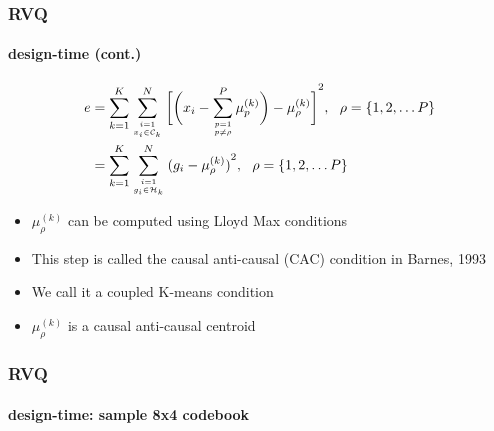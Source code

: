 \begin{frame}
\frametitle{RVQ}
\framesubtitle{design-time (cont.)}
\mypagenum
\scriptsize
\begin{align*}
e	&= \KmeansSum{\bigg[\RVQmultipleKmeansonealternate\bigg]}^2, \ \ \rho=\{1, 2, \ldots P\}\notag\\
&={\RVQerroralternate}, \ \ \rho=\{1, 2, \ldots P\}
\end{align*}
\vspace{0.1in}
\normalsize
\begin{itemize}
\item $\mu_\rho^{(k)}$ can be computed using Lloyd Max conditions
\item This step is called the causal anti-causal (CAC) condition in Barnes, 1993
\item We call it a coupled K-means condition
\item $\mu_\rho^{(k)}$ is a causal anti-causal centroid
\end{itemize}
\end{frame}


\begin{frame}
\frametitle{RVQ}
\framesubtitle{design-time: sample 8x4 codebook}
\mypagenum
\setcounter{subfigure}{0}
\begin{figure}[h!]
\centering{}
\end{figure}
\end{frame}


